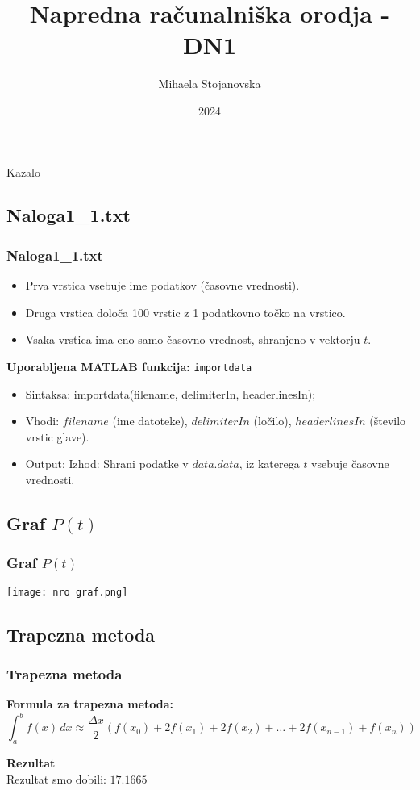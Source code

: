 \documentclass{beamer}
\title{Napredna računalniška orodja - DN1}
\author{Mihaela Stojanovska}
\date{2024}
\begin{document}
\begin{frame}
    \titlepage
\end{frame}

\begin{frame}{Kazalo}
    \tableofcontents
\end{frame}


\begin{frame}
\section{Naloga1\_1.txt}
\frametitle{Naloga1\_1.txt}
    \begin{itemize}
        \item Prva vrstica vsebuje ime podatkov (časovne vrednosti).
        \item Druga vrstica določa 100 vrstic z 1 podatkovno točko na vrstico.
        \item Vsaka vrstica ima eno samo časovno vrednost, shranjeno v vektorju $t$.
    \end{itemize}
    \vspace{0.5cm}
    \textbf{Uporabljena MATLAB funkcija:} \texttt{importdata} \\
    \begin{itemize}
        \item Sintaksa: importdata(filename, delimiterIn, headerlinesIn);
        \item Vhodi: $filename$ (ime datoteke), $delimiterIn$ (ločilo), $headerlinesIn$ (število vrstic glave).
        \item Output: Izhod: Shrani podatke v $data.data$, iz katerega $t$ vsebuje časovne vrednosti.
    \end{itemize}
\end{frame}


\begin{frame}
\section{Graf $P(t)$}
\frametitle{Graf $P(t)$}
    \texttt{[image: nro graf.png]}
    \centering
\end{frame}


\begin{frame}
\section{Trapezna metoda}
\frametitle{Trapezna metoda}
    \textbf{Formula za trapezna metoda:}
    \[
    \int_{a}^{b} f(x) \, dx \approx \frac{\Delta x}{2} \left( f(x_0) + 2f(x_1) + 2f(x_2) + \dots + 2f(x_{n-1}) + f(x_n) \right)
    \]
    
    \vspace{0.5cm}
    \textbf{Rezultat} \\
    Rezultat smo dobili: $17.1665$
\end{frame}
\end{document}
